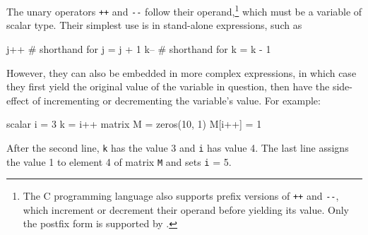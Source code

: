 The unary operators \texttt{++} and \verb|--| follow their
operand,\footnote{The C programming language also supports prefix
  versions of \texttt{++} and \verb|--|, which increment or decrement
  their operand before yielding its value. Only the postfix form is
  supported by .}  which must be a variable of scalar
type. Their simplest use is in stand-alone expressions, such as
%
\begin{code}
j++  # shorthand for j = j + 1
k--  # shorthand for k = k - 1
\end{code}
%
However, they can also be embedded in more complex expressions, in
which case they first yield the original value of the variable in
question, then have the side-effect of incrementing or decrementing
the variable's value. For example:
%
\begin{code}
scalar i = 3
k = i++
matrix M = zeros(10, 1)
M[i++] = 1
\end{code}
%
After the second line, \texttt{k} has the value 3 and \texttt{i} has
value 4. The last line assigns the value 1 to element 4 of
matrix \texttt{M} and sets \texttt{i} = 5.











